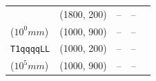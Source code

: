\begin{table}
\begin{tabular}{ lrrcc }
      & (1800, 200)
      & -- & -- \\
      ($10^{0}\unit{mm}$)
      & (1000, 900)
      & --   & --   \\ [0.5ex]
      \texttt{T1qqqqLL}
      & (1000, 200)
      & -- & -- \\
      ($10^{5}\unit{mm}$)
      & (1000, 900)
      & --   & -- \\ [0.5ex]
      \hline
    \end{tabular}
\end{table}

